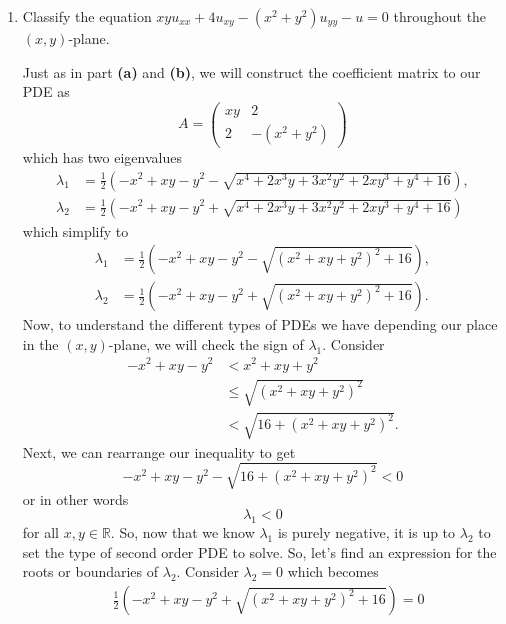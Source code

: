\documentclass[a4paper,12pt]{article}
\newcommand{\reals}{\mathbb{R}}
\newcommand{\pmat}[1]{\begin{pmatrix} #1 \end{pmatrix}}
\begin{document}
\begin{enumerate}[label = \textbf{(\alph*)}]
            \item Classify the equation $ xyu_{xx} + 4u_{xy} - (x^2 + y^2)u_{yy} - u = 0 $ throughout the $ (x,y) $-plane.
            
            Just as in part \textbf{(a)} and \textbf{(b)}, we will construct the coefficient matrix to our PDE as
            \[
                A =
                \pmat{
                    xy & 2 \\
                    2 & -(x^2 + y^2)
                }
            \]
            which has two eigenvalues
            \begin{align*}
                \lambda_1 &= \frac{1}{2} \left(-x^2 + x y - y^2 -  \sqrt{x^4+2 x^3 y+3 x^2 y^2+2 x y^3+y^4+16}\right), \\
                \lambda_2 &= \frac{1}{2} \left(-x^2 + x y - y^2 + \sqrt{x^4+2 x^3 y+3 x^2 y^2+2 x y^3+y^4+16}\right)
            \end{align*}
            which simplify to
            \begin{align*}
                \lambda_1 &= \frac{1}{2} \left(-x^2 + x y - y^2 - \sqrt{\left(x^2+x y+y^2\right)^2+16} \right), \\
                \lambda_2 &= \frac{1}{2} \left(-x^2 + x y - y^2 + \sqrt{\left(x^2+x y+y^2\right)^2+16} \right).
            \end{align*}
            Now, to understand the different types of PDEs we have depending our place in the $ (x,y) $-plane, we will check the sign of $ \lambda_1 $. Consider
            \begin{align*}
                -x^2 + xy - y^2 &< x^2 + xy + y^2 \\
                &\leq \sqrt{(x^2 + xy + y^2)^2} \\
                &< \sqrt{16 + (x^2 + xy + y^2)^2}.
            \end{align*}
            Next, we can rearrange our inequality to get
            \[
                -x^2 + xy - y^2 - \sqrt{16 + (x^2 + xy + y^2)^2} < 0
            \]
            or in other words
            \[
                \lambda_1 < 0
            \]
            for all $ x,y \in \reals $. So, now that we know $ \lambda_1 $ is purely negative, it is up to $ \lambda_2 $ to set the type of second order PDE to solve. So, let's find an expression for the roots or boundaries of $ \lambda_2 $. Consider $ \lambda_2 = 0 $ which becomes
            \begin{align*}
                & \frac{1}{2} \left(-x^2 + x y - y^2 + \sqrt{\left(x^2+x y+y^2\right)^2+16} \right) = 0 \\

\end{align*}
\end{enumerate}
\end{document}
